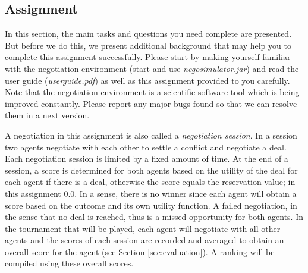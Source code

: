 \documentclass[a4paper]{article}
\begin{document}
\subsection{Assignment}
In this section, the main tasks and questions you need complete are presented. But before we do this, we present additional background that may help you to complete this assignment successfully. Please start by making yourself familiar with the negotiation environment \cite{Lin12} (start and use \textit{negosimulator.jar})  and read the user guide (\textit{userguide.pdf}) as well as this assignment provided to you carefully. Note that the negotiation environment is a scientific software tool which is being improved constantly. Please report any major bugs found so that we can resolve them in a next version.


A negotiation in this assignment is also called a {\em negotiation session}. In a session two agents negotiate with each other to settle a conflict and negotiate a deal. Each negotiation session is limited by a fixed amount of time. At the end of a session, a score is determined for both agents based on the utility of the deal for each agent if there is a deal, otherwise the score equals the reservation value; in this assignment 0.0. In a sense, there is no winner since each agent will obtain a score based on the outcome and its own utility function. A failed negotiation, in the sense that no deal is reached, thus is a missed opportunity for both agents. In the tournament that will be played, each agent will negotiate with all other agents and the scores of each session are recorded and averaged to obtain an overall score for the agent (see Section \ref{sec:evaluation}). A ranking will be compiled using these overall scores.

\end{document}
